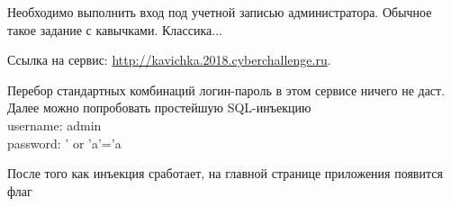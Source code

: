 
Необходимо выполнить вход под учетной записью администратора. Обычное такое задание с кавычками. Классика...

Ссылка на сервис: \url{http://kavichka.2018.cyberchallenge.ru}.

\solutionSection

Перебор стандартных комбинаций логин-пароль в этом сервисе ничего не даст. Далее можно попробовать простейшую SQL-инъекцию\\
username: admin\\
password: ' or 'a'='a

После того как инъекция сработает, на главной странице приложения появится флаг


